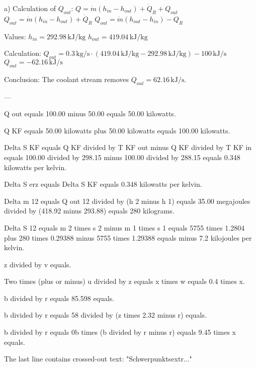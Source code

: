 a) Calculation of \( Q_{out} \):  
\( Q = \dot{m} (h_{in} - h_{out}) + \dot{Q}_R + Q_{out} \)  
\( Q_{out} = \dot{m} (h_{in} - h_{out}) + \dot{Q}_R \)  
\( Q_{out} = \dot{m} (h_{out} - h_{in}) - \dot{Q}_R \)  

Values:  
\( h_{in} = 292.98 \, \text{kJ/kg} \)  
\( h_{out} = 419.04 \, \text{kJ/kg} \)  

Calculation:  
\( Q_{out} = 0.3 \, \text{kg/s} \cdot (419.04 \, \text{kJ/kg} - 292.98 \, \text{kJ/kg}) - 100 \, \text{kJ/s} \)  
\( Q_{out} = -62.16 \, \text{kJ/s} \)  

Conclusion:  
The coolant stream removes \( Q_{out} = 62.16 \, \text{kJ/s} \).  

---

Q out equals 100.00 minus 50.00 equals 50.00 kilowatts.  

Q KF equals 50.00 kilowatts plus 50.00 kilowatts equals 100.00 kilowatts.  

Delta S KF equals Q KF divided by T KF out minus Q KF divided by T KF in equals 100.00 divided by 298.15 minus 100.00 divided by 288.15 equals 0.348 kilowatts per kelvin.  

Delta S erz equals Delta S KF equals 0.348 kilowatts per kelvin.  

Delta m 12 equals Q out 12 divided by (h 2 minus h 1) equals 35.00 megajoules divided by (418.92 minus 293.88) equals 280 kilograms.  

Delta S 12 equals m 2 times s 2 minus m 1 times s 1 equals 5755 times 1.2804 plus 280 times 0.29388 minus 5755 times 1.29388 equals minus 7.2 kilojoules per kelvin.

z divided by v equals.  

Two times (plus or minus) u divided by z equals x times w equals 0.4 times x.  

b divided by r equals 85.598 equals.  

b divided by r equals 58 divided by (z times 2.32 minus r) equals.  

b divided by r equals 0b times (b divided by r minus r) equals 9.45 times x equals.  

The last line contains crossed-out text: "Schwerpunktsextr..."